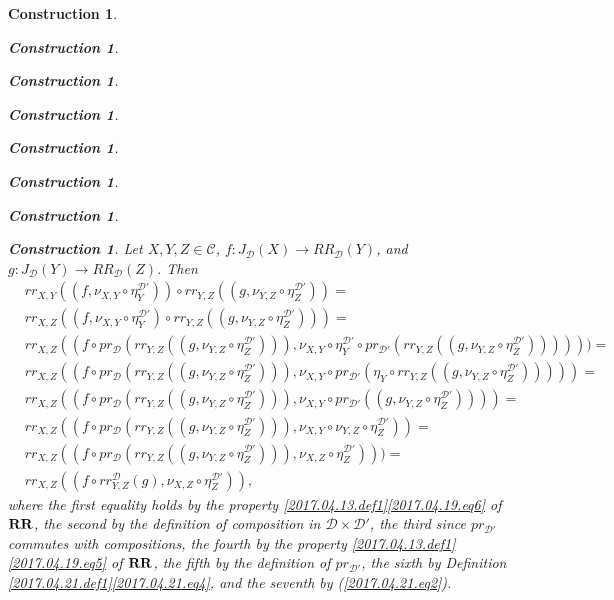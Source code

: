 \documentclass[12pt]{amsart}
\numberwithin{proposition}{subsection}
\newtheorem{construction}[proposition]{Construction}
\newcommand{\llabel}[1]{\label{#1}}
\newcommand{\sr}{\rightarrow}
\newcommand{\RR}{{\bf RR}}
\newcommand{\C}{{\mathcal C}}
\newcommand{\D}{{\mathcal D}}
\begin{document}
\begin{construction}
\begin{construction}
\begin{construction}
\begin{construction}
\begin{construction}
\begin{construction}
\begin{construction}
\begin{construction}
Let $X,Y,Z\in\C$, $f:J_{\D}(X)\sr RR_{\D}(Y)$, and $g:J_{\D}(Y)\sr RR_{\D}(Z)$.  Then
\begin{equation}
  \llabel{2017.04.21.eq5}
  \begin{split}
      &rr_{X,Y}((f,\nu_{X,Y}\circ \eta^{\D'}_Y))\circ rr_{Y,Z}((g,\nu_{Y,Z}\circ \eta^{\D'}_Z))=
    \\&rr_{X,Z}((f,\nu_{X,Y}\circ \eta^{\D'}_Y)\circ rr_{Y,Z}((g,\nu_{Y,Z}\circ \eta^{\D'}_Z)))=
    \\&rr_{X,Z}((f\circ pr_{\D}(rr_{Y,Z}((g,\nu_{Y,Z}\circ \eta^{\D'}_Z))),\nu_{X,Y}\circ\eta^{\D'}_Y\circ pr_{\D'}(rr_{Y,Z}((g,\nu_{Y,Z}\circ\eta^{\D'}_Z))) )))=
    \\&rr_{X,Z}((f\circ pr_{\D}(rr_{Y,Z}((g,\nu_{Y,Z}\circ \eta^{\D'}_Z))),\nu_{X,Y}\circ pr_{\D'}(\eta_Y\circ rr_{Y,Z}((g,\nu_{Y,Z}\circ\eta^{\D'}_Z))) ))=
    \\&rr_{X,Z}((f\circ pr_{\D}(rr_{Y,Z}((g,\nu_{Y,Z}\circ \eta^{\D'}_Z))),\nu_{X,Y}\circ pr_{\D'}((g,\nu_{Y,Z}\circ\eta^{\D'}_Z)) ))=
    \\&rr_{X,Z}((f\circ pr_{\D}(rr_{Y,Z}((g,\nu_{Y,Z}\circ \eta^{\D'}_Z))),\nu_{X,Y}\circ\nu_{Y,Z}\circ\eta^{\D'}_Z) )=
    \\&rr_{X,Z}((f\circ pr_{\D}(rr_{Y,Z}((g,\nu_{Y,Z}\circ \eta^{\D'}_Z))),\nu_{X,Z}\circ\eta^{\D'}_Z) ))=
    \\&rr_{X,Z}((f\circ rr^{\D}_{Y,Z}(g),\nu_{X,Z}\circ\eta^{\D'}_Z)),
  \end{split}
\end{equation}%
%
where the first equality holds by the property
\ref{2017.04.13.def1}\ref{2017.04.19.eq6} of $\RR$, the second by the
definition of composition in $\D\times\D'$, the third since $pr_{\D'}$ commutes
with compositions, the fourth by the property
\ref{2017.04.13.def1}\ref{2017.04.19.eq5} of $\RR$, the fifth by the definition
of $pr_{\D'}$, the sixth by Definition
\ref{2017.04.21.def1}\ref{2017.04.21.eq4}, and the seventh by
(\ref{2017.04.21.eq2}).


\end{construction}
\end{construction}
\end{construction}
\end{construction}
\end{construction}
\end{construction}
\end{construction}
\end{construction}
\end{document}
